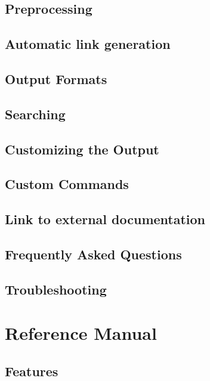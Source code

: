 \documentclass[a4paper]{report}
\begin{document}
\chapter{Preprocessing}\label{preprocessing}\hypertarget{preprocessing}{}
\chapter{Automatic link generation}\label{autolink}\hypertarget{autolink}{}
\chapter{Output Formats}\label{output}\hypertarget{output}{}
\chapter{Searching}\label{searching}\hypertarget{searching}{}
\chapter{Customizing the Output}\label{customize}\hypertarget{customize}{}
\chapter{Custom Commands}\label{custcmd}\hypertarget{custcmd}{}
\chapter{Link to external documentation}\label{external}\hypertarget{external}{}
\chapter{Frequently Asked Questions}\label{faq}\hypertarget{faq}{}
\chapter{Troubleshooting}\label{trouble}\hypertarget{trouble}{}
\part{Reference Manual}
\chapter{Features}\label{features}\hypertarget{features}{}
\end{document}
